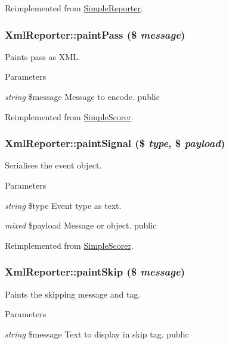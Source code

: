 Reimplemented from \hyperlink{class_simple_reporter_a54672d58e0fad0e0e672159dd4f61124}{SimpleReporter}.\hypertarget{class_xml_reporter_a0ca13e019e6eac83f1f5c91cae05f30d}{
\subsubsection[{paintPass}]{\setlength{\rightskip}{0pt plus 5cm}XmlReporter::paintPass (\$ {\em message})}}
\label{class_xml_reporter_a0ca13e019e6eac83f1f5c91cae05f30d}
Paints pass as XML. 
\begin{DoxyParams}{Parameters}
\item[{\em string}]\$message Message to encode.  public \end{DoxyParams}


Reimplemented from \hyperlink{class_simple_scorer_a02d68e8d94800e50603413d1913c25d0}{SimpleScorer}.\hypertarget{class_xml_reporter_a813227fd450676eaaf89f3d513580e25}{
\subsubsection[{paintSignal}]{\setlength{\rightskip}{0pt plus 5cm}XmlReporter::paintSignal (\$ {\em type}, \/  \$ {\em payload})}}
\label{class_xml_reporter_a813227fd450676eaaf89f3d513580e25}
Serialises the event object. 
\begin{DoxyParams}{Parameters}
\item[{\em string}]\$type Event type as text. \item[{\em mixed}]\$payload Message or object.  public \end{DoxyParams}


Reimplemented from \hyperlink{class_simple_scorer_a968ed699077b65e8a55e2a86fabe5589}{SimpleScorer}.\hypertarget{class_xml_reporter_acab5f1fd58264ba3efb725b9a52db405}{
\subsubsection[{paintSkip}]{\setlength{\rightskip}{0pt plus 5cm}XmlReporter::paintSkip (\$ {\em message})}}
\label{class_xml_reporter_acab5f1fd58264ba3efb725b9a52db405}
Paints the skipping message and tag. 
\begin{DoxyParams}{Parameters}
\item[{\em string}]\$message Text to display in skip tag.  public \end{DoxyParams}


